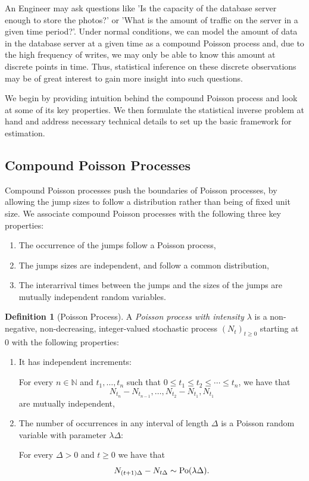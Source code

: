 \documentclass[a4paper,11pt]{article}
\theoremstyle{theorem}
\theoremstyle{definition}
\newtheorem{defn}{Definition}[section]
\theoremstyle{remark}
\begin{document}
An Engineer may ask questions like 'Is the capacity of the database server enough to store the photos?' or 'What is the amount of traffic on the server in a given time period?'. Under normal conditions, we can model the amount of data in the database server at a given time as a compound Poisson process and, due to the high frequency of writes, we may only be able to know this amount at discrete points in time. Thus, statistical inference on these discrete observations may be of great interest to gain more insight into such questions.   

We begin by providing intuition behind the compound Poisson process and look at some of its key properties. We then formulate the statistical inverse problem at hand and address necessary technical details to set up the basic framework for estimation.

\subsection{Compound Poisson Processes}

Compound Poisson processes push the boundaries of Poisson processes, by allowing the jump sizes to follow a distribution rather than being of fixed unit size. We associate compound Poisson processes with the following three key properties:
\begin{enumerate}
\item The occurrence of the jumps follow a Poisson process,
\item The jumps sizes are independent, and follow a common distribution,
\item The interarrival times between the jumps and the sizes of the jumps are mutually independent random variables.
\end{enumerate}

\begin{defn}[Poisson Process]
A \textit{Poisson process with intensity $\lambda$} is a non-negative, non-decreasing, integer-valued stochastic process $(N_{t})_{t \geq 0}$ starting at 0 with the following properties:

\begin{enumerate}

\item It has independent increments:

For every $n \in \mathbb{N}$ and $t_1, \dotsc, t_n$ such that $0 \leq t_{1} \leq t_{2} \leq \dotsb \leq t_{n}$, we have that 
\[
N_{t_{n}} - N_{t_{n-1}}, \dotsc , N_{t_2} - N_{t_1}, N_{t_{1}}
\]
are mutually independent,
\item The number of occurrences in any interval of length $\Delta$ is a Poisson random variable with parameter $\lambda \Delta$:

For every $\Delta > 0$ and $t \geq 0$ we have that
\[ 
N_{(t+1) \Delta} - N_{t \Delta} \sim {\rm Po}(\lambda \Delta).
\]
\end{enumerate}
\end{defn}
\end{document}
